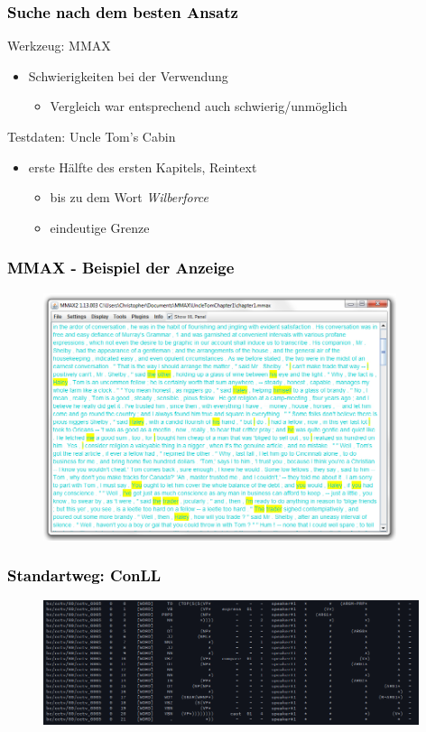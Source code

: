 \documentclass[xcolor=dvipsnames]{beamer}
\begin{document}
\begin{frame}\frametitle{\textcolor{black}{Suche nach dem besten Ansatz}}

\begin{block}{Werkzeug: MMAX}
\begin{itemize}
\item Schwierigkeiten bei der Verwendung
\begin{itemize}
\item Vergleich war entsprechend auch schwierig/unmöglich
\end{itemize}
\end{itemize}
\end{block}

\begin{block}{Testdaten: Uncle Tom's Cabin}
\begin{itemize}
\item erste Hälfte des ersten Kapitels, Reintext
\begin{itemize}
\item bis zu dem Wort \emph{Wilberforce}
\item eindeutige Grenze
\end{itemize}
\end{itemize}
\end{block}

\end{frame}


\begin{frame}\frametitle{\textcolor{black}{{MMAX - Beispiel der Anzeige}}}
\begin{figure}
\includegraphics[height=7.25cm]{cm_mmax.jpg}
\end{figure}

\end{frame}

\begin{frame}\frametitle{\textcolor{black}{{Standartweg: ConLL}}}
\begin{figure}
  \includegraphics[width=11cm]{img/conll.png}
\end{figure}

\end{frame}
\end{document}

